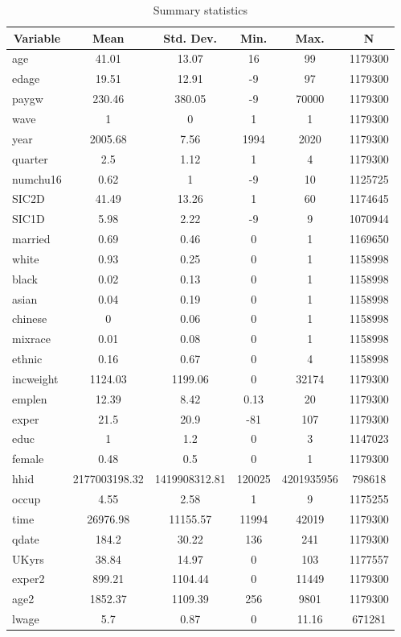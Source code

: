 
\begin{table}[htbp]\centering \caption{Summary statistics \label{sumstats}}
\begin{tabular}{l c c c c c}\hline\hline
\multicolumn{1}{c}{\textbf{Variable}} & \textbf{Mean}
 & \textbf{Std. Dev.}& \textbf{Min.} &  \textbf{Max.} & \textbf{N}\\ \hline
age & 41.01 & 13.07 & 16 & 99 & 1179300\\
edage & 19.51 & 12.91 & -9 & 97 & 1179300\\
paygw & 230.46 & 380.05 & -9 & 70000 & 1179300\\
wave & 1 & 0 & 1 & 1 & 1179300\\
year & 2005.68 & 7.56 & 1994 & 2020 & 1179300\\
quarter & 2.5 & 1.12 & 1 & 4 & 1179300\\
numchu16 & 0.62 & 1 & -9 & 10 & 1125725\\
SIC2D & 41.49 & 13.26 & 1 & 60 & 1174645\\
SIC1D & 5.98 & 2.22 & -9 & 9 & 1070944\\
married & 0.69 & 0.46 & 0 & 1 & 1169650\\
white & 0.93 & 0.25 & 0 & 1 & 1158998\\
black & 0.02 & 0.13 & 0 & 1 & 1158998\\
asian & 0.04 & 0.19 & 0 & 1 & 1158998\\
chinese & 0 & 0.06 & 0 & 1 & 1158998\\
mixrace & 0.01 & 0.08 & 0 & 1 & 1158998\\
ethnic & 0.16 & 0.67 & 0 & 4 & 1158998\\
incweight & 1124.03 & 1199.06 & 0 & 32174 & 1179300\\
emplen & 12.39 & 8.42 & 0.13 & 20 & 1179300\\
exper & 21.5 & 20.9 & -81 & 107 & 1179300\\
educ & 1 & 1.2 & 0 & 3 & 1147023\\
female & 0.48 & 0.5 & 0 & 1 & 1179300\\
hhid & 2177003198.32 & 1419908312.81 & 120025 & 4201935956 & 798618\\
occup & 4.55 & 2.58 & 1 & 9 & 1175255\\
time & 26976.98 & 11155.57 & 11994 & 42019 & 1179300\\
qdate & 184.2 & 30.22 & 136 & 241 & 1179300\\
UKyrs & 38.84 & 14.97 & 0 & 103 & 1177557\\
exper2 & 899.21 & 1104.44 & 0 & 11449 & 1179300\\
age2 & 1852.37 & 1109.39 & 256 & 9801 & 1179300\\
lwage & 5.7 & 0.87 & 0 & 11.16 & 671281\\
\hline\end{tabular}
\end{table}
